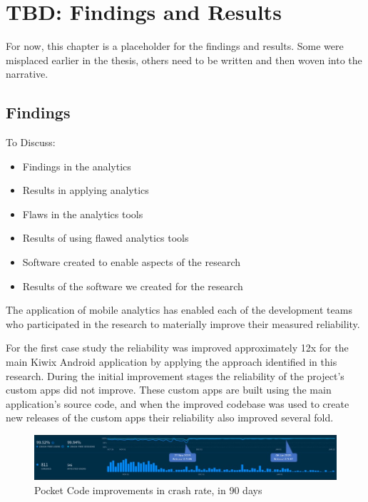 \chapter{TBD: Findings and Results}
For now, this chapter is a placeholder for the findings and results. Some were misplaced earlier in the thesis, others need to be written and then woven into the narrative.



\section{Findings}
\label{findings-section}

To Discuss:
\begin{itemize}
    \item Findings in the analytics
    \item Results in applying analytics
    \item Flaws in the analytics tools
    \item Results of using flawed analytics tools
    \item Software created to enable aspects of the research
    \item Results of the software we created for the research
\end{itemize}

The application of mobile analytics has enabled each of the development teams who participated in the research to materially improve their measured reliability. 

For the first case study the reliability was improved approximately 12x for the main Kiwix Android application by applying the approach identified in this research. 
During the initial improvement stages the reliability of the project's custom apps did not improve. These custom apps are built using the main application's source code, and when the improved codebase was used to create new releases of the custom apps their reliability also improved several fold.

\begin{figure}[htbp!]
    \centering
    \includegraphics[width=\textwidth]{images/annotated_pocketcode_90_day_fabric_crashlytics_report.jpg}
    \caption{Pocket Code improvements in crash rate, in 90 days}
    \label{fig:pocketcode_improvements_in_crash_rate}
\end{figure}


